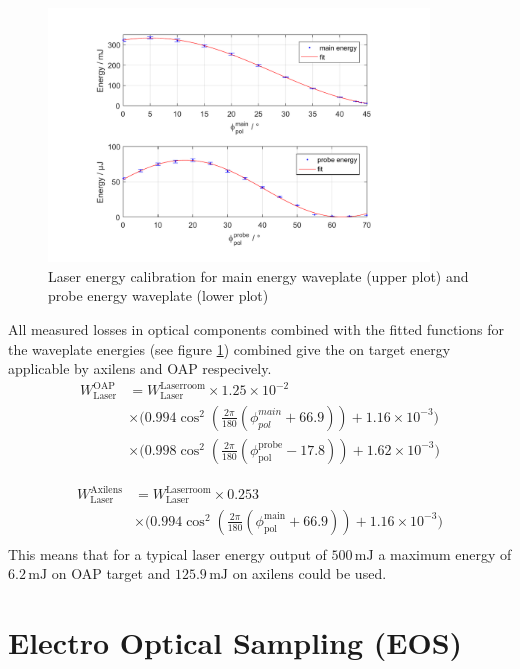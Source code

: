 \begin{figure}[htbp]
\includegraphics[width=0.9\textwidth]{experiment/images/edited/waveplate_calibration.pdf}
\caption{Laser energy calibration for main energy waveplate (upper plot) and probe energy waveplate (lower plot)}
\label{img:LaserEnergyCalib}
\end{figure}
All measured losses in optical components combined with the fitted functions for the waveplate energies (see figure \ref{img:LaserEnergyCalib}) combined give the on target energy applicable by axilens and OAP respecively.
\begin{align*}
 W_\mathrm{Laser}^\mathrm{OAP} &= W_\mathrm{Laser}^\mathrm{Laserroom}\times 1.25\times10^{-2}\\ &\times\big( 0.994 \cos^2(\frac{2\pi}{180} (\phi_{pol}^{main}+66.9)) +1.16\times 10^{-3}\big)\\
  &\times \big(0.998 \cos^2(\frac{2\pi}{180}(\phi_\mathrm{pol}^\mathrm{probe}-17.8 )) +1.62\times 10^{-3}\big)
\end{align*}

\begin{align}
 W_\mathrm{Laser}^\mathrm{Axilens} &= W_\mathrm{Laser}^\mathrm{Laserroom}\times 0.253\\ &\times\big( 0.994 \cos^2(\frac{2\pi}{180} (\phi_\mathrm{pol}^\mathrm{main}+66.9)) +1.16\times 10^{-3}\big)\\
\end{align}
This means that for a typical laser energy output of $500\, \mathrm{mJ}$ a maximum energy of $6.2\, \mathrm{mJ}$ on OAP target and $125.9\,\mathrm{mJ}$ on axilens could be used.


\section{Electro Optical Sampling (EOS)}

